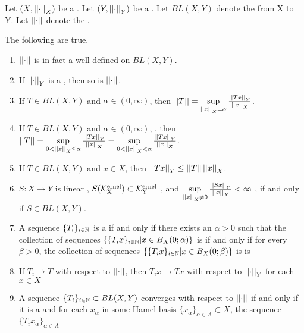 \begin{prop}
\label{prop:BLO} 
Let $(X,\left|\left| \cdot \right|\right|_X)$ be a \SeminormedSpace. 
Let $(Y, \left|\left| \cdot \right|\right|_Y)$ be a \SeminormedSpace.
Let $BL(X,Y)$ denote the \SpaceOfBoundedLinearOperators from X to Y. 
Let $\left|\left| \cdot \right|\right|$ denote the \OperatorSeminorm. 

The following are true. 
\begin{enumerate}
\item $\left|\left| \cdot \right|\right|$ is in fact a well-defined \Seminorm on $BL(X,Y)$. 
\item If $\left|\left| \cdot \right|\right|_Y$ is a \Norm, then so is $\left|\left| \cdot \right|\right|$. 
\item If $T \in BL(X,Y)$ and $\alpha \in (0,\infty)$, then $\left|\left| T \right|\right| = \sup\limits_{\left|\left| x \right|\right|_X =\alpha} \frac{\left|\left| Tx \right|\right|_Y}{\left|\left| x \right|\right|_X}$. 
\item If $T \in BL(X,Y)$ and $\alpha \in (0,\infty)$, , then $\left|\left| T \right|\right| = \sup\limits_{0<\left|\left| x \right|\right|_X \leq \alpha} \frac{\left|\left| Tx \right|\right|_Y}{\left|\left| x \right|\right|_X}= \sup\limits_{0<\left|\left| x \right|\right|_X < \alpha} \frac{\left|\left| Tx \right|\right|_Y}{\left|\left| x \right|\right|_X}$. 
\item If $T \in BL(X,Y)$ and $x \in X$, then $\left|\left| Tx \right|\right|_Y \leq \left|\left| T \right|\right| \left|\left| x \right|\right|_X$. 
\item $S:X \to Y$ is linear
, $S(\bf\mathcal{K}\rm^{ernel}_X) \subset \bf\mathcal{K}\rm^{ernel}_Y$
, and $\sup\limits_{\left|\left| x \right|\right|_X \neq 0} \frac{\left|\left| Sx \right|\right|_Y}{\left|\left| x \right|\right|_X} < \infty$
, if and only if $S \in BL(X,Y)$. 
\item A sequence $\{T_i\}_{i \in \mathbb{N}}$ is a \PseudometricCauchySequence
    if and only if
    there exists an $\alpha > 0$ 
    such that the collection of sequences 
    $\{\{T_ix\}_{i \in \mathbb{N}} | x \in B_X(0;\alpha)\}$ is
    \UniformlyCauchy
    if and only if
    for every $\beta > 0$, 
    the collection of sequences 
    $\{\{T_ix\}_{i \in \mathbb{N}} | x \in B_X(0;\beta)\}$ is
    is \UniformlyCauchy
\item If $T_i \to T$ with respect to $\left|\left| \cdot \right|\right|$, then $T_ix \to Tx$ with respect to $\left|\left| \cdot \right|\right|_Y$ for each $x \in X$
\item A sequence $\{T_i\}_{i \in \mathbb{N}} \subset BL(X,Y)$ 
    converges %
    with respect to $\left|\left| \cdot \right|\right|$ 
    if and only if it is a \PseudometricCauchySequence 
    and for each $x_\alpha$ 
    in some Hamel basis $\{x_\alpha\}_{\alpha \in A} \subset X$,
    the sequence $\{T_ix_\alpha\}_{\alpha \in A}$

\end{enumerate}
\end{prop}
